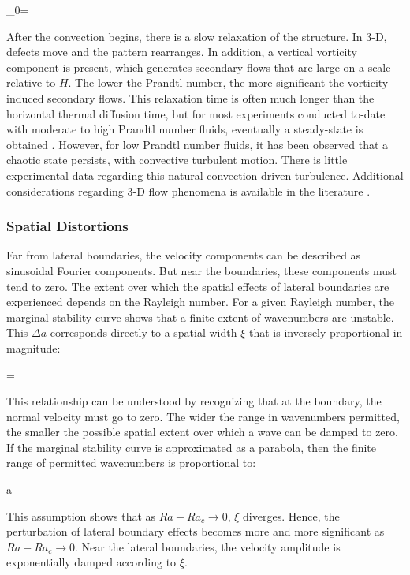 \documentclass[10pt]{article}
\numberwithin{equation}{section} %
\begin{document}
\beq
\tau_0=
\eeq

After the convection begins, there is a slow relaxation of the structure. In 3-D, defects move and the pattern rearranges. In addition, a vertical vorticity component is present, which generates secondary flows that are large on a scale relative to \(H\). The lower the Prandtl number, the more significant the vorticity-induced secondary flows. This relaxation time is often much longer than the horizontal thermal diffusion time, but for most experiments conducted to-date with moderate to high Prandtl number fluids, eventually a steady-state is obtained \cite{berge}. However, for low Prandtl number fluids, it has been observed that a chaotic state persists, with convective turbulent motion. There is little experimental data regarding this natural convection-driven turbulence. Additional considerations regarding 3-D flow phenomena is available in the literature \cite{berge}.

\subsubsection{Spatial Distortions}

Far from lateral boundaries, the velocity components can be described as sinusoidal Fourier components. But near the boundaries, these components must tend to zero. The extent over which the spatial effects of lateral boundaries are experienced depends on the Rayleigh number. For a given Rayleigh number, the marginal stability curve shows that a finite extent of wavenumbers are unstable. This \(\Delta a\) corresponds directly to a spatial width \(\xi\) that is inversely proportional in magnitude:

\beq
\xi=
\eeq

This relationship can be understood by recognizing that at the boundary, the normal velocity must go to zero. The wider the range in wavenumbers permitted, the smaller the possible spatial extent over which a wave can be damped to zero. If the marginal stability curve is approximated as a parabola, then the finite range of permitted wavenumbers is proportional to:

\beq
\Delta a\propto{}
\eeq

This assumption shows that as \(Ra-Ra_c\rightarrow0\), \(\xi\) diverges. Hence, the perturbation of lateral boundary effects becomes more and more significant as \(Ra-Ra_c\rightarrow0\). Near the lateral boundaries, the velocity amplitude is exponentially damped according to \(\xi\).
\end{document}
